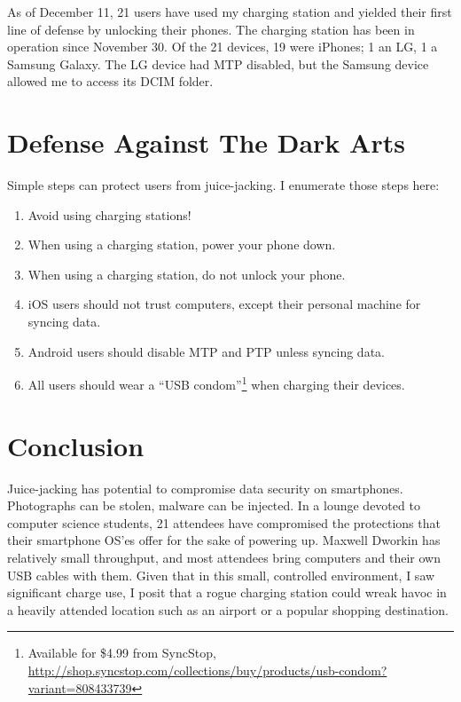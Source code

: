 \documentclass[11pt]{article} %
\begin{document}
As of December 11, 21 users have used my charging station and yielded their first line of defense by unlocking their phones. The charging station has been in operation since November 30. Of the 21 devices, 19 were iPhones; 1 an LG, 1 a Samsung Galaxy. The LG device had MTP disabled, but the Samsung device allowed me to access its DCIM folder. 

\section{Defense Against The Dark Arts}

Simple steps can protect users from juice-jacking. I enumerate those steps here: 

\begin{enumerate}
\item Avoid using charging stations! 
\item When using a charging station, power your phone down. 
\item When using a charging station, do not unlock your phone. 
\item iOS users should not trust computers, except their personal machine for syncing data. 
\item Android users should disable MTP and PTP unless syncing data. 
\item All users should wear a ``USB condom''\footnote{Available for \$4.99 from SyncStop, \url{http://shop.syncstop.com/collections/buy/products/usb-condom?variant=808433739}} when charging their devices. 

\end{enumerate}

\section{Conclusion}

Juice-jacking has potential to compromise data security on smartphones. Photographs can be stolen, malware can be injected. In a lounge devoted to computer science students, 21 attendees have compromised the protections that their smartphone OS'es offer for the sake of powering up. Maxwell Dworkin has relatively small throughput, and most attendees bring computers and their own USB cables with them. Given that in this small, controlled environment, I saw significant charge use, I posit that a rogue charging station could wreak havoc in a heavily attended location such as an airport or a popular shopping destination. 
\end{document}
